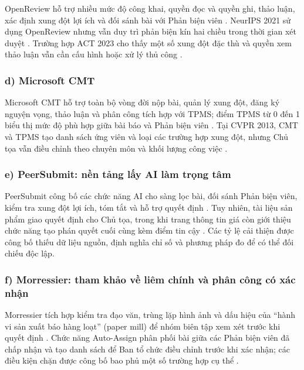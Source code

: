 OpenReview hỗ trợ nhiều mức độ công khai, quyền đọc và quyền ghi, thảo luận, xác định xung đột lợi ích và đối sánh bài với Phản biện viên \cite{ch2ref5}. NeurIPS 2021 sử dụng OpenReview nhưng vẫn duy trì phản biện kín hai chiều trong thời gian xét duyệt \cite{ch2ref59}. Trường hợp ACT 2023 cho thấy một số xung đột đặc thù và quyền xem thảo luận vẫn cần cấu hình hoặc xử lý thủ công \cite{ch2ref60}.

\subsubsection{d) Microsoft CMT}

Microsoft CMT hỗ trợ toàn bộ vòng đời nộp bài, quản lý xung đột, đăng ký nguyện vọng, thảo luận và phân công tích hợp với TPMS; điểm TPMS từ 0 đến 1 biểu thị mức độ phù hợp giữa bài báo và Phản biện viên \cite{ch2ref6,ch2ref7,ch2ref8}. Tại CVPR 2013, CMT và TPMS tạo danh sách ứng viên và loại các trường hợp xung đột, nhưng Chủ tọa vẫn điều chỉnh theo chuyên môn và khối lượng công việc \cite{ch2ref61}.

\subsubsection{e) PeerSubmit: nền tảng lấy AI làm trọng tâm}

PeerSubmit công bố các chức năng AI cho sàng lọc bài, đối sánh Phản biện viên, kiểm tra xung đột lợi ích, tóm tắt và hỗ trợ quyết định \cite{ch2ref48}. Tuy nhiên, tài liệu sản phẩm giao quyết định cho Chủ tọa, trong khi trang thông tin giá còn giới thiệu chức năng tạo phán quyết cuối cùng kèm điểm tin cậy \cite{ch2ref48,ch2ref52}. Các tỷ lệ cải thiện được công bố thiếu dữ liệu nguồn, định nghĩa chỉ số và phương pháp đo để có thể đối chiếu độc lập.

\subsubsection{f) Morressier: tham khảo về liêm chính và phân công có xác nhận}

Morressier tích hợp kiểm tra đạo văn, trùng lặp hình ảnh và dấu hiệu của ``hành vi sản xuất báo hàng loạt'' (paper mill) để nhóm biên tập xem xét trước khi quyết định \cite{ch2ref47}. Chức năng Auto-Assign phân phối bài giữa các Phản biện viên đã chấp nhận và tạo danh sách để Ban tổ chức điều chỉnh trước khi xác nhận; các điều kiện chặn được công bố bao phủ một số trường hợp cụ thể \cite{ch2ref55}.

